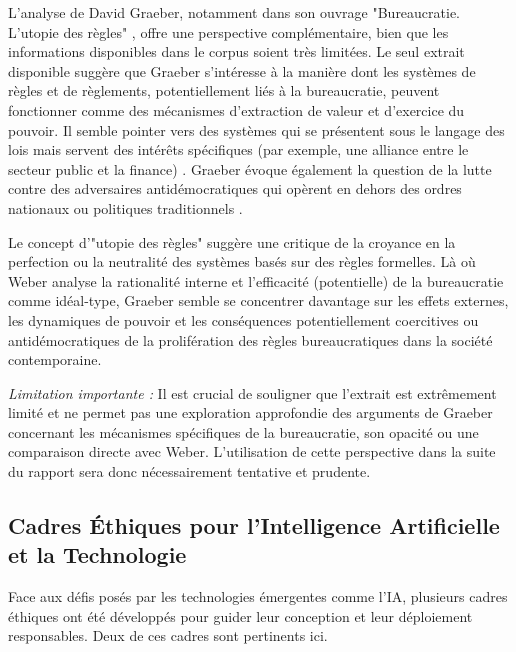 \documentclass[10pt, twocolumn]{article}
\begin{document}
L'analyse de David Graeber, notamment dans son ouvrage "Bureaucratie. L'utopie des règles" \citep{Graeber2015}, offre une perspective complémentaire, bien que les informations disponibles dans le corpus soient très limitées. Le seul extrait disponible \citep{Graeber2015} suggère que Graeber s'intéresse à la manière dont les systèmes de règles et de règlements, potentiellement liés à la bureaucratie, peuvent fonctionner comme des mécanismes d'extraction de valeur et d'exercice du pouvoir. Il semble pointer vers des systèmes qui se présentent sous le langage des lois mais servent des intérêts spécifiques (par exemple, une alliance entre le secteur public et la finance) \citep{Graeber2015}. Graeber évoque également la question de la lutte contre des adversaires antidémocratiques qui opèrent en dehors des ordres nationaux ou politiques traditionnels \citep{Graeber2015}.

Le concept d'"utopie des règles" suggère une critique de la croyance en la perfection ou la neutralité des systèmes basés sur des règles formelles. Là où Weber analyse la rationalité interne et l'efficacité (potentielle) de la bureaucratie comme idéal-type, Graeber semble se concentrer davantage sur les effets externes, les dynamiques de pouvoir et les conséquences potentiellement coercitives ou antidémocratiques de la prolifération des règles bureaucratiques dans la société contemporaine.

\textit{Limitation importante :} Il est crucial de souligner que l'extrait \citep{Graeber2015} est extrêmement limité et ne permet pas une exploration approfondie des arguments de Graeber concernant les mécanismes spécifiques de la bureaucratie, son opacité ou une comparaison directe avec Weber. L'utilisation de cette perspective dans la suite du rapport sera donc nécessairement tentative et prudente.

\subsection{Cadres Éthiques pour l'Intelligence Artificielle et la Technologie}

Face aux défis posés par les technologies émergentes comme l'IA, plusieurs cadres éthiques ont été développés pour guider leur conception et leur déploiement responsables. Deux de ces cadres sont pertinents ici.
\end{document}
